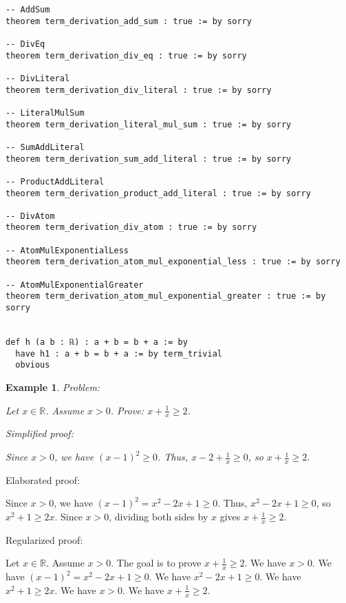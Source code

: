 \documentclass{article}
\newtheorem{example}{Example}
\begin{document}
\begin{tcolorbox}[colback=white!10, width=\linewidth]
\begin{lstlisting}[language=Lean4]
-- AddSum
theorem term_derivation_add_sum : true := by sorry

-- DivEq
theorem term_derivation_div_eq : true := by sorry

-- DivLiteral
theorem term_derivation_div_literal : true := by sorry

-- LiteralMulSum
theorem term_derivation_literal_mul_sum : true := by sorry

-- SumAddLiteral
theorem term_derivation_sum_add_literal : true := by sorry

-- ProductAddLiteral
theorem term_derivation_product_add_literal : true := by sorry

-- DivAtom
theorem term_derivation_div_atom : true := by sorry

-- AtomMulExponentialLess
theorem term_derivation_atom_mul_exponential_less : true := by sorry

-- AtomMulExponentialGreater
theorem term_derivation_atom_mul_exponential_greater : true := by sorry


def h (a b : ℝ) : a + b = b + a := by
  have h1 : a + b = b + a := by term_trivial
  obvious

\end{lstlisting}
\end{tcolorbox}


\begin{example}
Problem:
\begin{tcolorbox}[colback=yellow!10, width=\linewidth]
Let $x\in\mathbb{R}$. Assume $x> 0$. Prove: $x + \frac{1}{x} \ge 2$.
\end{tcolorbox}

Simplified proof:
\begin{tcolorbox}[colback=blue!10, width=\linewidth]
Since $x>0$, we have $(x-1)^2 \ge 0$. Thus, $x - 2 + \frac{1}{x} \ge 0$, so $x + \frac{1}{x} \ge 2$.
\end{tcolorbox}
\end{example}

Elaborated proof:
\begin{tcolorbox}[colback=green!10, width=\linewidth]
Since $x>0$, we have $(x-1)^2 = x^2 - 2x + 1 \ge 0$. Thus, $x^2 - 2x + 1 \ge 0$, so $x^2 + 1 \ge 2x$. Since $x > 0$, dividing both sides by $x$ gives $x + \frac{1}{x} \ge 2$.
\end{tcolorbox}

Regularized proof:
\begin{tcolorbox}[colback=red!10, width=\linewidth]
Let $x\in\mathbb{R}$.
Assume $x>0$.
The goal is to prove $x + \frac{1}{x} \ge 2$.
We have $x>0$.
We have ${{(x-1)}}^2 = x^2 - 2x + 1 \ge 0$.
We have $x^2 - 2x + 1 \ge 0$.
We have $x^2 + 1 \ge 2x$.
We have $x > 0$.
We have $x + \frac{1}{x} \ge 2$.
\end{tcolorbox}
\end{document}

